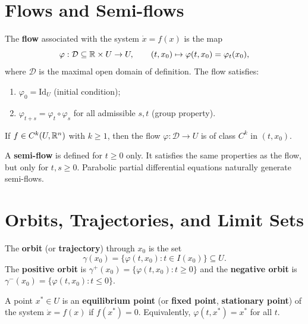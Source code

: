 \section{Flows and Semi-flows}

\begin{definition}[Flow]
The \textbf{flow} associated with the system $\dot{x} = f(x)$ is the map
\[
    \varphi : \mathcal{D} \subseteq \mathbb{R} \times U \to U, \qquad
    (t, x_0) \mapsto \varphi(t, x_0) = \varphi_t(x_0),
\]
where $\mathcal{D}$ is the maximal open domain of definition. The flow
satisfies:
\begin{enumerate}
    \item $\varphi_0 = \mathrm{Id}_U$ (initial condition);
    \item $\varphi_{t+s} = \varphi_t \circ \varphi_s$ for all admissible
    $s, t$ (group property).
\end{enumerate}
\end{definition}

\begin{proposition}
If $f \in C^k(U, \mathbb{R}^n)$ with $k \geq 1$, then the flow
$\varphi : \mathcal{D} \to U$ is of class $C^k$ in $(t, x_0)$.
\end{proposition}

\begin{definition}
A \textbf{semi-flow} is defined for $t \geq 0$ only. It satisfies the same
properties as the flow, but only for $t, s \geq 0$. Parabolic partial
differential equations naturally generate semi-flows.
\end{definition}

\section{Orbits, Trajectories, and Limit Sets}

\begin{definition}[Orbit]
The \textbf{orbit} (or \textbf{trajectory}) through $x_0$ is the set
\[
    \gamma(x_0) = \{\varphi(t, x_0) : t \in I(x_0)\} \subseteq U.
\]
The \textbf{positive orbit} is $\gamma^+(x_0) = \{\varphi(t, x_0) : t \geq 0\}$
and the \textbf{negative orbit} is $\gamma^-(x_0) = \{\varphi(t, x_0) : t \leq 0\}$.
\end{definition}

\begin{definition}
A point $x^* \in U$ is an \textbf{equilibrium point} (or \textbf{fixed point},
\textbf{stationary point}) of the system $\dot{x} = f(x)$ if $f(x^*) = 0$.
Equivalently, $\varphi(t, x^*) = x^*$ for all $t$.
\end{definition}

